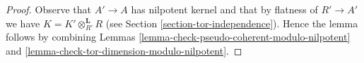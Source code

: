 \documentclass[10pt,a4paper]{amsart}
\theoremstyle{plain}
\theoremstyle{definition}
\theoremstyle{remark}
\numberwithin{equation}{subsection}
\begin{document}
\begin{proof}
Observe that $A' \to A$ has nilpotent kernel and that by flatness of
$R' \to A'$ we have $K = K' \otimes_{R'}^\mathbf{L} R$ (see
Section \ref{section-tor-independence}). Hence the lemma follows by combining
Lemmas \ref{lemma-check-pseudo-coherent-modulo-nilpotent} and
\ref{lemma-check-tor-dimension-modulo-nilpotent}.
\end{proof}
\end{document}
